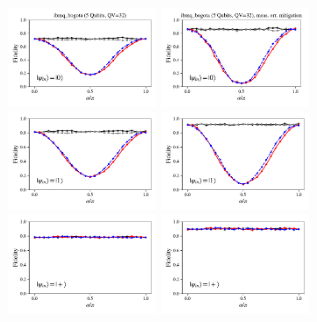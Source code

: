 \documentclass[a4paper]{article}
\begin{document}
\begin{figure}[H]
	\centering
	\includegraphics[width=0.35\textwidth]{fidelity_qc8_mit1_state0}
	\includegraphics[width=0.35\textwidth]{fidelity_qc8_mit0_state0}
	\\
	\includegraphics[width=0.35\textwidth]{fidelity_qc8_mit1_state1}
	\includegraphics[width=0.35\textwidth]{fidelity_qc8_mit0_state1}
	\\
	\includegraphics[width=0.35\textwidth]{fidelity_qc8_mit1_state2}
	\includegraphics[width=0.35\textwidth]{fidelity_qc8_mit0_state2}

\end{figure}
\end{document}
